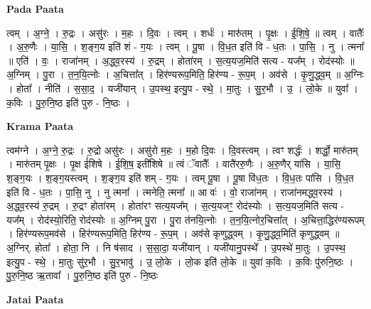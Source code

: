 \documentclass[17pt]{extarticle}
\begin{document}
\textbf{Pada Paata} \newline

त्वम् । अ॒ग्ने॒ । रु॒द्रः । असु॑रः । म॒हः । दि॒वः । त्वम् । शर्धः॑ । मारु॑तम् । पृ॒क्षः । ई॒शि॒षे॒ ॥ त्वम् । वातैः᳚ । अ॒रु॒णैः । या॒सि॒ । श॒ङ्ग॒य इति॑ शं - ग॒यः । त्वम् । पू॒षा । वि॒ध॒त इति॑ वि - ध॒तः । पा॒सि॒ । नु । त्मना᳚ ॥ एति॑ । वः॒ । राजा॑नम् । अ॒द्ध्व॒रस्य॑ । रु॒द्रम् । होता॑रम् । स॒त्य॒यज॒मिति॑ सत्य - यज᳚म् । रोद॑स्योः ॥ अ॒ग्निम् । पु॒रा । त॒न॒यि॒त्नोः । अ॒चित्ता᳚त् । हिर॑ण्यरूप॒मिति॒ हिर॑ण्य - रू॒प॒म् । अव॑से । कृ॒णु॒द्ध्व॒म् ॥ अ॒ग्निः । होता᳚ । नीति॑ । स॒सा॒द॒ । यजी॑यान् । उ॒पस्थ॒ इत्यु॒प - स्थे॒ । मा॒तुः । सु॒र॒भौ । उ॒ । लो॒के ॥ युवा᳚ । क॒विः । पु॒रु॒नि॒ष्ठ इति॑ पुरु - नि॒ष्ठः ।  \newline


\textbf{Krama Paata} \newline

त्वम॑ग्ने । अ॒ग्ने॒ रु॒द्रः । रु॒द्रो असु॑रः । असु॑रो म॒हः । म॒हो दि॒वः । दि॒वस्त्वम् । त्वꣳ शर्द्धः॑ । शर्द्धो॒ मारु॑तम् । मारु॑तम् पृ॒क्षः । पृ॒क्ष ई॑शिषे । ई॒शि॒ष॒ इती॑शिषे ॥ त्वं ॅवातैः᳚ । वातै॑ररु॒णैः । अ॒रु॒णैर् या॑सि । या॒सि॒ श॒ङ्ग॒यः । श॒ङ्ग॒यस्त्वम् । श॒ङ्ग॒य इति॑ शम् - ग॒यः । त्वम् पू॒षा । पू॒षा वि॑ध॒तः । वि॒ध॒तः पा॑सि । वि॒ध॒त इति॑ वि - ध॒तः । पा॒सि॒ नु । नु त्मना᳚ । त्मनेति॒ त्मना᳚ ॥ आ वः॑ । वो॒ राजा॑नम् । राजा॑नमद्ध्व॒रस्य॑ । अ॒द्ध्व॒रस्य॑ रु॒द्रम् । रु॒द्रꣳ होता॑रम् । होता॑रꣳ सत्य॒यज᳚म् । स॒त्य॒यजꣳ॒॒ रोद॑स्योः । स॒त्य॒यज॒मिति॑ सत्य - यज᳚म् । रोद॑स्यो॒रिति॒ रोद॑स्योः ॥ अ॒ग्निम् पु॒रा । पु॒रा त॑नयि॒त्नोः । त॒न॒यि॒त्नोर॒चित्ता᳚त् । अ॒चित्ता॒द्धिर॑ण्यरूपम् । हिर॑ण्यरूप॒मव॑से । हिर॑ण्यरूप॒मिति॒ हिर॑ण्य - रू॒प॒म् । अव॑से कृणुद्ध्वम् । कृ॒णु॒द्ध्व॒मिति॑ कृणुद्ध्वम् ॥ अ॒ग्निर्. होता᳚ । होता॒ नि । 
नि ष॑साद । स॒सा॒दा॒ यजी॑यान् । यजी॑यानु॒पस्थे᳚ । उ॒पस्थे॑ मा॒तुः । उ॒पस्थ॒ इत्यु॒प - स्थे॒ । मा॒तुः सु॑र॒भौ । सु॒र॒भावु॑ । उ॒ लो॒के । लो॒क इति॑ लो॒के ॥ युवा॑ क॒विः । क॒विः पु॑रुनि॒ष्ठः । पु॒रु॒नि॒ष्ठ ऋ॒तावा᳚ । पु॒रु॒नि॒ष्ठ इति॑ पुरु - नि॒ष्ठः \newline

\textbf{Jatai Paata} \newline
\end{document}
